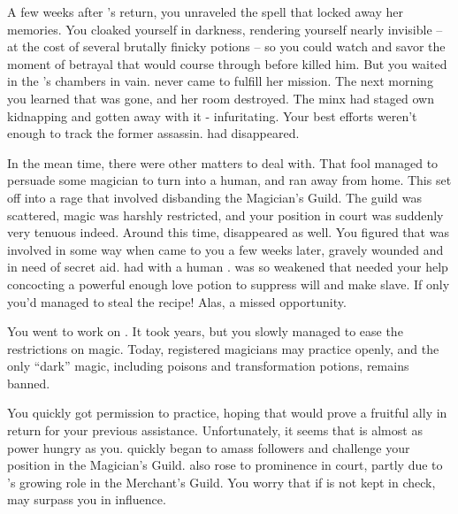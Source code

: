 \documentclass[char]{NeptuneBall}
\begin{document}
A few weeks after \cQueen{}'s return, you unraveled the spell that locked away her memories. You cloaked yourself in darkness, rendering yourself nearly invisible -- at the cost of several brutally finicky potions -- so you could watch and savor the moment of betrayal that would course through \cKing{} before \cQueen{} killed him. But you waited in the \cKing{\King}'s chambers in vain. \cQueen{} never came to fulfill her mission. The next morning you learned that \cQueen{\they} was gone, and her room destroyed. The minx had staged \cQueen{\them} own kidnapping and gotten away with it - infuritating. Your best efforts weren't enough to track the former assassin. \cQueen{\They} had disappeared.

In the mean time, there were other matters to deal with. That fool \cAriel{} managed to persuade some magician to turn \cAriel{\them} into a human, and ran away from home. This set \cKing{} off into a rage that involved  \cKing{\them} disbanding the Magician's Guild. The guild was scattered, magic was harshly restricted, and your position in court was suddenly very tenuous indeed. Around this time, \cWitch{} disappeared as well. You figured that \cWitch{\they} was involved in some way when \cWitch{\they} came to you a few weeks later, gravely wounded and in need of secret aid. \cWitch{\They} had with \cWitch{\them} a human \cSlave{\prince}. \cWitch{} was so weakened that \cWitch{\they} needed your help concocting a powerful enough love potion to suppress \cSlave{\their} will and make \cSlave{\them} \cWitch{\them} slave. If only you'd managed to steal the recipe! Alas, a missed opportunity.

You went to work on \cKing{}. It took years, but you slowly managed to ease the restrictions on magic. Today, registered magicians may practice openly, and the only ``dark'' magic, including poisons and transformation potions, remains banned. 

You quickly got \cWitch{} permission to practice, hoping that \cWitch{\they} would prove a fruitful ally in return for your previous assistance. Unfortunately, it seems that \cWitch{\they} is almost as power hungry as you. \cWitch{\They} quickly began to amass followers and challenge your position in the Magician's Guild. \cWitch{} also rose to prominence in court, partly due to \cWitch{\their} \cSlave{\sibling}'s growing role in the Merchant's Guild. You worry that if \cWitch{} is not kept in check, \cWitch{\they} may surpass you in influence.
\end{document}
